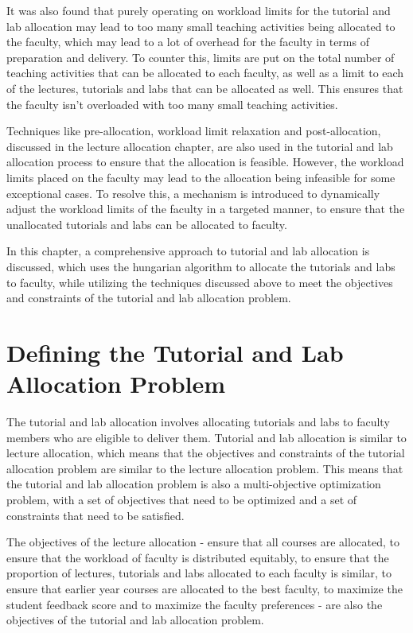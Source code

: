 It was also found that purely operating on workload limits for the tutorial and lab allocation may lead to too many small teaching activities being allocated to the faculty, which may lead to a lot of overhead for the faculty in terms of preparation and delivery. To counter this, limits are put on the total number of teaching activities that can be allocated to each faculty, as well as a limit to each of the lectures, tutorials and labs that can be allocated as well. This ensures that the faculty isn't overloaded with too many small teaching activities.

Techniques like pre-allocation, workload limit relaxation and post-allocation, discussed in the lecture allocation chapter, are also used in the tutorial and lab allocation process to ensure that the allocation is feasible. However, the workload limits placed on the faculty may lead to the allocation being infeasible for some exceptional cases. To resolve this, a mechanism is introduced to dynamically adjust the workload limits of the faculty in a targeted manner, to ensure that the unallocated tutorials and labs can be allocated to faculty.

In this chapter, a comprehensive approach to tutorial and lab allocation is discussed, which uses the hungarian algorithm to allocate the tutorials and labs to faculty, while utilizing the techniques discussed above to meet the objectives and constraints of the tutorial and lab allocation problem.

\section{Defining the Tutorial and Lab Allocation Problem}

The tutorial and lab allocation involves allocating tutorials and labs to faculty members who are eligible to deliver them. Tutorial and lab allocation is similar to lecture allocation, which means that the objectives and constraints of the tutorial allocation problem are similar to the lecture allocation problem. This means that the tutorial and lab allocation problem is also a multi-objective optimization problem, with a set of objectives that need to be optimized and a set of constraints that need to be satisfied.

The objectives of the lecture allocation - ensure that all courses are allocated, to ensure that the workload of faculty is distributed equitably, to ensure that the proportion of lectures, tutorials and labs allocated to each faculty is similar, to ensure that earlier year courses are allocated to the best faculty, to maximize the student feedback score and to maximize the faculty preferences - are also the objectives of the tutorial and lab allocation problem.

